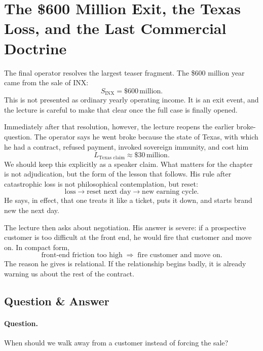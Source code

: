 \section{The \$600 Million Exit, the Texas Loss, and the Last Commercial Doctrine}

The final operator resolves the largest teaser fragment. The \$600 million year came from the sale of INX:
\begin{equation}
S_{\text{INX}} = \$600\,\text{million}.
\end{equation}
This is not presented as ordinary yearly operating income. It is an exit event, and the lecture is careful to make that clear once the full case is finally opened.

Immediately after that resolution, however, the lecture reopens the earlier broke-question. The operator says he went broke because the state of Texas, with which he had a contract, refused payment, invoked sovereign immunity, and cost him
\begin{equation}
L_{\text{Texas claim}} \approx \$30\,\text{million}.
\end{equation}
We should keep this explicitly as a speaker claim. What matters for the chapter is not adjudication, but the form of the lesson that follows. His rule after catastrophic loss is not philosophical contemplation, but reset:
\begin{equation}
\text{loss} \to \text{reset next day} \to \text{new earning cycle}.
\end{equation}
He says, in effect, that one treats it like a ticket, puts it down, and starts brand new the next day.

The lecture then asks about negotiation. His answer is severe: if a prospective customer is too difficult at the front end, he would fire that customer and move on. In compact form,
\begin{equation}
\text{front-end friction too high}
\;\Rightarrow\;
\text{fire customer and move on}.
\end{equation}
The reason he gives is relational. If the relationship begins badly, it is already warning us about the rest of the contract.

\subsection{Question \& Answer}

\paragraph{Question.} When should we walk away from a customer instead of forcing the sale?

